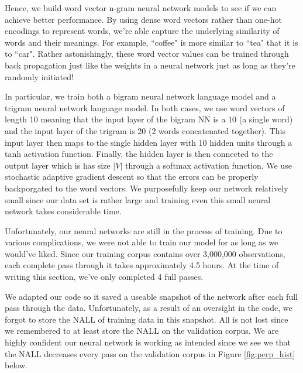 \documentclass[fleqn,12pt]{SelfArx} %
\begin{document}
Hence, we build word vector n-gram neural network models to see if we can achieve better performance. By using dense word vectors rather than one-hot encodings to represent words, we're able capture the underlying similarity of words and their meanings. For example, ``coffee" is more similar to ``tea" that it is to ``car". Rather astonishingly, these word vector values can be trained through back propagation just like the weights in a neural network just as long as they're randomly initiated! 

 In particular, we train both a bigram neural network language model and a trigram neural network language model. In both cases, we use word vectors of length 10 meaning that the input layer of the bigram NN is a 10 (a single word) and the input layer of the trigram is 20 (2 words concatenated together). This input layer then maps to the single hidden layer with 10 hidden units through a tanh activation function. Finally, the hidden layer is then connected to the output layer which is has size $|V|$ through a softmax activation function. We use stochastic adaptive gradient descent so that the errors can be properly backporgated to the word vectors. We purposefully keep our network relatively small since our data set is rather large and training even this small neural network takes considerable time. 
 
 Unfortunately, our neural networks are still in the process of training. Due to various complications, we were not able to train our model for as long as we would've liked. Since our training corpus contains over 3,000,000 observations, each complete pass through it takes approximately 4.5 hours. At the time of writing this section, we've only completed 4 full passes. 
 
 We adapted our code so it saved a useable snapshot of the network after each full pass through the data. Unfortunately, as a result of an oversight in the code, we forgot to store the NALL of training data in this snapshot. All is not lost since we remembered to at least store the NALL on the validation corpus. We are highly confident our neural network is working as intended since we see we that the NALL decreases every pass on the validation corpus in Figure \ref{fig:perp_hist} below.
 
\end{document}
